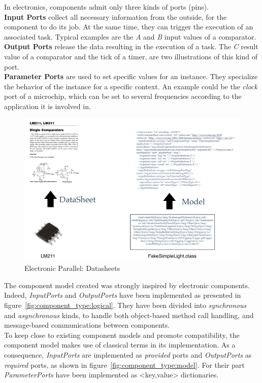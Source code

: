 In electronics, components admit only three kinds of ports (pins).\\
{\bf Input Ports} collect all necessary information from the outside, for the component to do its job. At the same time, they can trigger the execution of an associated task. Typical examples are the \textit{A} and \textit{B} input values of a comparator.\\
{\bf Output Ports} release the data resulting in the execution of a task. The \textit{C} result value of a comparator and the tick of a timer, are two illustrations of this kind of port.\\
{\bf Parameter Ports} are used to set specific values for an instance. They specialize the behavior of the instance for a specific context. An example could be the \textit{clock} port of a microchip, which can be set to several frequencies according to the application it is involved in.\\

\begin{figure}
\centering
	\includegraphics[width=.9\textwidth]{part2/pics/DataSheet.pdf}
	\caption{Electronic Parallel: Datasheets}
 	\label{fig:elecDataSheet}
\end{figure}

The component model created was strongly inspired by electronic components. Indeed, {\it InputPorts} and {\it OutputPorts} have been implemented as presented in figure~\ref{fig:component_type:logical}. They have been divided into \textit{synchronous} and \textit{asynchronous} kinds, to handle both object-based method call handling, and message-based communications between components.\\ 
To keep close to existing component models and promote compatibility, the component model makes use of classical terms in its implementation. As a consequence, {\it InputPorts} are implemented as {\it provided} ports and {\it OutputPorts} as {\it required} ports, as shown in figure~\ref{fig:component_type:model}. For their part {\it ParameterPorts} have been implemented as <key,value> dictionaries.\\

